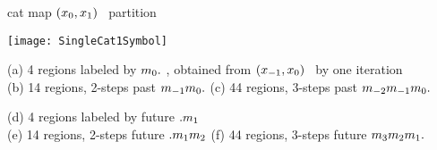 \begin{frame}{cat map $(x_{0},x_{1})$  \statesp\ partition}
\begin{center}
	\texttt{[image: SingleCat1Symbol]}
\end{center}

{\scriptsize
(a) 4 regions labeled by ${m_{0}}.$ , obtained from
$(x_{-1},x_{0})$ \statesp\ by one iteration
\\
(b) 14 regions, 2-steps past ${m_{-1}}{m_{0}}.$
(c) 44 regions, 3-steps past ${m_{-2}}{m_{-1}}{m_{0}}.$

\medskip

(d) 4 regions labeled by future $.{m_{1}}$
\\
(e) 14 regions, 2-steps  future $.{m_{1}}{m_{2}}$
(f) 44 regions, 3-steps future {\brick} ${m_{3}}{m_{2}}{m_{1}}.$
}
\end{frame}

